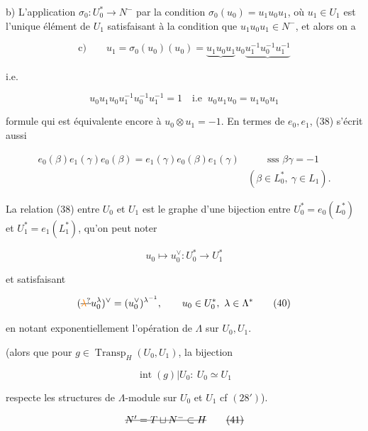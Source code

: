 
b) L'application $\sigma_0:U_0^*\longrightarrow N^-$ par la condition $\sigma_0(u_0)=u_1u_0u_1$, où $u_1\in U_1$ est l'unique élément de $U_1$ satisfaisant à la condition que $u_1u_0u_1\in N^-$, et alors on a

\[
\text{c)}\qquad u_1=\sigma_0(u_0)(u_0)=\underbrace{u_1u_0u_1}u_0\underbrace{u_1^{-1}u_0^{-1}u_1^{-1}}
\]

i.e.

\[
 u_0u_1u_0u_1^{-1}u_0^{-1}u_1^{-1}=1\quad\text{i.e }\ u_0u_1u_0=u_1u_0u_1\tag*{(38)}
\]

formule qui est équivalente encore à $u_0\otimes u_1=-1$. En termes de $e_0,e_1$, (38) s'écrit aussi

\[
\begin{aligned}
 e_0(\beta)e_1(\gamma)e_0(\beta)=e_1(\gamma)e_0(\beta)e_1(\gamma)&\qquad\text{sss }\beta\gamma=-1\\
 &(\beta\in L_0^*,\ \gamma\in L_1).
\end{aligned}\tag*{(39)}
\]

La relation (38)  entre $U_0$ et $U_1$ est le graphe d'une bijection entre $U_0^*=e_0(L_0^*)$ et $U_1^*=e_1(L_1^*)$, qu'on peut noter

\[
u_0\longmapsto u_0^\vee:U_0^*\longrightarrow U_1^*
\]

et satisfaisant

\[
(\deleted{\unsure{\lambda}}u_0^\lambda)^\vee=(u_0^\vee)^{\lambda^{-1}},\qquad u_0\in U_0^*,\ \lambda\in\Lambda^*\tag*{(40)}
\]

en notant exponentiellement l'opération  de $\Lambda$ sur $U_0,U_1$.


(alors que pour $g\in\operatorname{Transp}_H(U_0,U_1)$, la bijection

\[
\operatorname{int}(g)|U_0:\ U_0\simeq U_1
\]

respecte les structures de $\Lambda$-module sur $U_0$ et $U_1$ cf $(28')$).


\[
\deleted{N'=T\sqcup N^-\subset H}\tag*{\deleted{(41)}}
\]



